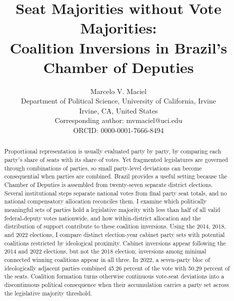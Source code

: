 \documentclass[11pt]{article}
\title{Seat Majorities without Vote Majorities:\\[0.3em]Coalition Inversions in Brazil's Chamber of Deputies}
\author{
Marcelo V. Maciel\\
Department of Political Science, University of California, Irvine\\
Irvine, CA, United States\\
Corresponding author: mvmaciel@uci.edu\\
ORCID: 0000-0001-7666-8494 }
\date{}
\begin{document}
\maketitle

\begin{abstract}
  Proportional representation is usually evaluated party by party, by comparing
  each party's share of seats with its share of votes. Yet fragmented
  legislatures are governed through combinations of parties, so small
  party-level deviations can become consequential when parties are combined.
  Brazil provides a useful setting because the Chamber of Deputies is assembled
  from twenty-seven separate district elections. Several institutional steps
  separate national votes from final party seat totals, and no national
  compensatory allocation reconciles them. I examine which politically
  meaningful sets of parties hold a legislative majority with less than half of
  all valid federal-deputy votes nationwide, and how within-district allocation
  and the distribution of support contribute to these coalition
  inversions. Using the 2014, 2018, and 2022 elections, I compare distinct
  election-year cabinet party sets with potential coalitions restricted by
  ideological proximity. Cabinet inversions appear following the 2014 and 2022
  elections, but not the 2018 election; inversions among minimal connected
  winning coalitions appear in all three. In 2022, a seven-party bloc of
  ideologically adjacent parties combined 45.26 percent of the vote with 50.29
  percent of the seats. Coalition formation turns otherwise continuous vote-seat
  deviations into a discontinuous political consequence when their accumulation
  carries a party set across the legislative majority threshold.


\end{abstract}
\end{document}

